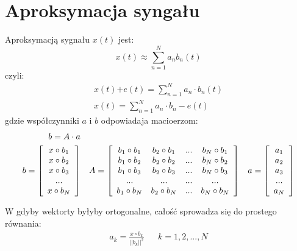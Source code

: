 \section{Aproksymacja syngału}
    Aproksymacją sygnału $x(t)$ jest:
    \begin{equation*}
        x(t) \approx \sum_{n=1}^{N}a_nb_n(t)
    \end{equation*}
    czyli:
    \begin{align*}
        x(t)  \textbf{+}e(t) = \sum_{n=1}^{N}a_n\cdot b_n(t)\\
        x(t) = \sum_{n=1}^{N}a_n\cdot b_n-e(t)
    \end{align*}
    gdzie współczynniki $a$ i $b$ odpowiadaja macioerzom:
    \begin{align*}
        b = A \cdot a\\
        b = \left[\begin{array}{c}
            x\circ b_1\\
            x\circ b_2\\
            x\circ b_3\\
            ...\\
            x\circ b_N
        \end{array}\right] &&
        A = \left[\begin{array}{c c c c}
            b_1\circ b_1 & b_2\circ b_1 & ... & b_N\circ b_1\\
            b_1\circ b_2 & b_2\circ b_2 & ... & b_N\circ b_2\\
            b_1\circ b_3 & b_2\circ b_3 & ... & b_N\circ b_3\\
            ...          & ...          & ... & ...\\
            b_1\circ b_N & b_2\circ b_N & ... & b_N\circ b_N
        \end{array}\right] &&
        a = \left[\begin{array}{c}
            a_1\\
            a_2\\
            a_3\\
            ...\\
            a_N
        \end{array}\right]
    \end{align*}

    W gdyby wektorty byłyby ortogonalne, całość sprowadza się do prostego równania:
    \begin{align*}
        a_k = \frac{x\circ b_k}{||b_k||^2} && k = 1, 2, ..., N
    \end{align*}

